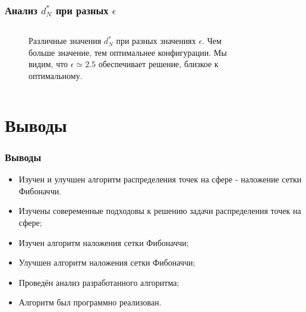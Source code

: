 \documentclass[12pt, aspectratio=169]{beamer}
\begin{document}
\begin{frame}
  \frametitle{Анализ $d_N^*$ при разных $\epsilon$}
  \begin{columns}
    \begin{column}{0.5\textwidth}
      \begin{figure}[h!]
        Различные значения $d_N^*$ при разных значениях $\epsilon$. Чем больше значение, тем оптимальнее конфигурации. Мы видим, что $\epsilon \simeq 2.5$ обеспечивает решение, близкое к оптимальному.
      \end{figure}
    \end{column}
    \begin{column}{0.5\textwidth}
      \begin{figure}[h!]
      \end{figure}
    \end{column}
  \end{columns}  
\end{frame}


\section{Выводы}

\begin{frame}
\frametitle{Выводы}

\begin{itemize}
    \item Изучен и улучшен алгоритм распределения точек на сфере - наложение сетки Фибоначчи.
    \item Изучены совеременные подходовы к решению задачи распределения точек на сфере;
    \item Изучен алгоритм наложения сетки Фибоначчи;
    \item Улучшен алгоритм наложения сетки Фибоначчи;
    \item Проведён анализ разработанного алгоритма;
    \item Алгоритм был программно реализован.
\end{itemize}
  
\end{frame}
\end{document}
